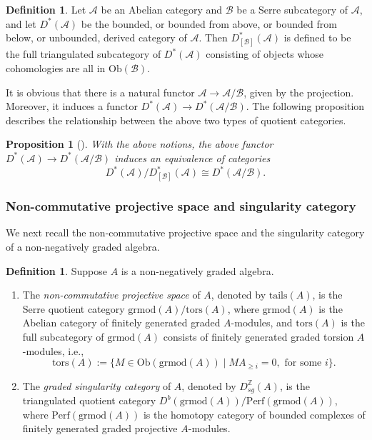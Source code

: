 \documentclass[11pt,reqno]{amsart}
\newtheorem{proposition}[theorem]{Proposition}
\theoremstyle{definition}
\newtheorem{definition}[theorem]{Definition}
\begin{document}
\begin{definition}\label{SeDef}
Let $\mathcal{A}$ be an Abelian category and $\mathcal{B}$ be a 
Serre subcategory of $\mathcal{A}$,
and let $D^{\ast}(\mathcal A)$ be 
the bounded, or bounded from
above, or bounded from below, or unbounded,
derived category of $\mathcal A$.
Then
$D^{\ast}_{[\mathcal{B}]}(\mathcal{A})$ 
is defined to be  
the full triangulated subcategory of $D^{\ast}(\mathcal{A})$
consisting of objects whose cohomologies are all in 
$\mathrm{Ob}(\mathcal{B})$. 
\end{definition}

It is obvious that there is a natural functor $\mathcal{A} \rightarrow \mathcal{A}/\mathcal{B}$,
given by the projection.
Moreover, it induces a
functor $D^{\ast}(\mathcal{A}) \rightarrow D^{\ast}(\mathcal{A}/\mathcal{B})$. 
The following proposition describes the relationship between the above 
two types of quotient
categories.

\begin{proposition}[{\cite[Theorem 3.2]{MJI}}]\label{serre}
With the above notions,
the above functor $D^{\ast}(\mathcal{A}) \rightarrow D^{\ast}(\mathcal{A}/\mathcal{B})$
induces an equivalence of categories
$$
 D^{\ast}(\mathcal{A})/D^{\ast}_{[\mathcal{B}]}(\mathcal{A}) \cong D^{\ast}
 (\mathcal{A}/\mathcal{B}).
$$  
\end{proposition}


\subsubsection{Non-commutative projective space and singularity category}

We next recall the non-commutative projective space and the 
singularity category of a non-negatively graded algebra.

\begin{definition}
Suppose $A$ is a non-negatively graded algebra.
\begin{enumerate}

\item The {\it non-commutative projective space} of $A$, denoted by 
$\mathrm{tails}(A)$,
is the Serre quotient category $\mathrm{grmod}(A) / \mathrm{tors}(A)$,
where $\mathrm{grmod}(A)$ is the Abelian category of finitely 
generated graded $A$-modules, 
and $\mathrm{tors}(A)$ is the full subcategory of $\mathrm{grmod}(A)$ 
consists of finitely generated graded torsion $A$-modules, i.e.,
$$
\mathrm{tors}(A) := \big\{M \in \mathrm{Ob}(\mathrm{grmod}(A))
 \mid M A_{\geq i} = 0, \,\, \mbox{for some} \,\, i   \big\}. 
$$

\item The {\it graded  singularity category}
of $A$, denoted by 
$D_{sg}^{\mathbb{Z}}(A)$,
is the triangulated quotient category $D^{b}( \mathrm{grmod}(A) 
) / \mathrm{Perf}( \mathrm{grmod}(A) )$,
where $\mathrm{Perf}(\mathrm{grmod}(A))$ is the homotopy category of 
bounded complexes of 
finitely generated graded projective $A$-modules.
\end{enumerate}
\end{definition}
\end{document}
